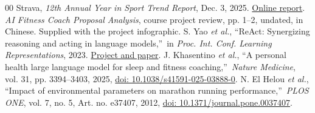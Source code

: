 \documentclass[conference]{IEEEtran}
\begin{document}
\begin{thebibliography}{00}
 Strava, \emph{12th Annual Year in Sport Trend Report}, Dec. 3, 2025. \href{https://press.strava.com/en-gb/articles/strava-releases-12th-annual-year-in-sport-trend-report-2025}{Online report}.
 \emph{AI Fitness Coach Proposal Analysis}, course project review, pp. 1--2, undated, in Chinese. Supplied with the project infographic.
 S. Yao \emph{et al.}, \textquotedblleft ReAct: Synergizing reasoning and acting in language models,\textquotedblright\ in \emph{Proc. Int. Conf. Learning Representations}, 2023. \href{https://react-lm.github.io/}{Project and paper}.
 J. Khasentino \emph{et al.}, \textquotedblleft A personal health large language model for sleep and fitness coaching,\textquotedblright\ \emph{Nature Medicine}, vol. 31, pp. 3394--3403, 2025, \href{https://doi.org/10.1038/s41591-025-03888-0}{doi: 10.1038/s41591-025-03888-0}.
 N. El Helou \emph{et al.}, \textquotedblleft Impact of environmental parameters on marathon running performance,\textquotedblright\ \emph{PLOS ONE}, vol. 7, no. 5, Art. no. e37407, 2012, \href{https://doi.org/10.1371/journal.pone.0037407}{doi: 10.1371/journal.pone.0037407}.
\end{thebibliography}
\end{document}
